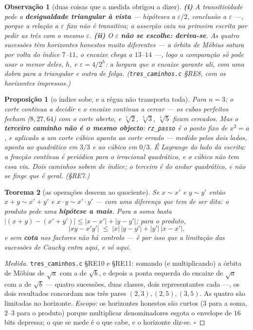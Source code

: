 \documentclass[11pt,a4paper]{article}
\newtheorem{teorema}{Teorema}
\newtheorem{proposicao}[teorema]{Proposição}
\newtheorem{observacao}{Observação}
\newcommand{\code}[1]{\texttt{\small #1}}
\begin{document}
\begin{observacao}[duas coisas que a medida obrigou a dizer]
\textbf{(i)} A transitividade pede a \textbf{desigualdade triangular à vista}
--- hipóteses a $\varepsilon/2$, conclusão a $\varepsilon$ ---, porque a relação
a $\varepsilon$ \emph{fixo} não é transitiva; a asserção caiu na primeira
escrita por pedir as três com o mesmo $\varepsilon$.
\textbf{(ii)} O $\varepsilon$ \textbf{não se escolhe: deriva-se}. As quatro
sucessões têm horizontes honestos muito diferentes --- a órbita de Möbius satura
por volta do índice $7$--$11$, o encaixe chega a $13$--$14$ ---, logo a
comparação só pode usar o menor deles, $h$, e $\varepsilon=4/2^{h}$: a largura
que o encaixe garante ali, com uma dobra para a triangular e outra de folga.
(\code{tres\_caminhos.c} §RE8, com os horizontes impressos.)
\end{observacao}

\begin{proposicao}[o índice sobe, e a régua não transporta toda]\label{prop:cubico}
Para $n=3$: o corte continua a decidir e o encaixe continua a cercar --- os
cubos perfeitos fecham ($8,27,64$) com o corte \emph{aberto}, e $\sqrt[3]{2}$,
$\sqrt[3]{3}$, $\sqrt[3]{5}$ ficam cercados. Mas o \textbf{terceiro caminho não
é o mesmo objecto}: \code{rz\_passo} é o ponto fixo de $x^{2}=a$, e aplicado a
um corte cúbico aponta ao corte \emph{errado} --- medido pelos dois lados,
aponta ao quadrático em $3/3$ e ao cúbico em $0/3$. É Lagrange do lado da
escrita: a fracção contínua é periódica para o irracional \emph{quadrático}, e o
cúbico não tem essa via. \emph{Dois caminhos sobem de índice; o terceiro é do
andar quadrático, e não se finge que é geral.} (§RE7.)
\end{proposicao}

\begin{teorema}[as operações descem ao quociente]\label{thm:desce}
Se $x\sim x'$ e $y\sim y'$ então $x+y\sim x'+y'$ e $x\cdot y\sim x'\cdot y'$ ---
com uma diferença que \emph{tem} de ser dita: o produto pede uma \textbf{hipótese
a mais}. Para a soma basta $|(x+y)-(x'+y')|\le|x-x'|+|y-y'|$; para o produto,
\[
|xy-x'y'|\;\le\;|x|\,|y-y'|+|y'|\,|x-x'|,
\]
e sem \textbf{cota} nos factores não há controlo --- é por isso que a limitação
das sucessões de Cauchy entra aqui, e só aqui.
\end{teorema}

\begin{proof}[Medida]
\code{tres\_caminhos.c} §RE10 e §RE11: somando (e multiplicando) a órbita de
Möbius de $\sqrt a$ com a de $\sqrt b$, e depois a ponta esquerda do encaixe de
$\sqrt a$ com a de $\sqrt b$ --- quatro sucessões, duas classes, dois
representantes cada ---, os dois resultados concordam nos três pares
$(2,3),(2,5),(3,5)$. As quatro são limitadas no horizonte.
\emph{Escopo:} os horizontes honestos são curtos ($3$ para a soma, $2$--$3$ para
o produto) porque multiplicar denominadores esgota o envelope de $16$ bits
depressa; o que se mede é o que cabe, e o horizonte diz-se. $\square$
\end{proof}
\end{document}
